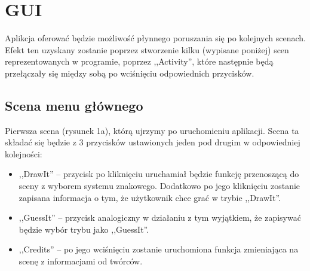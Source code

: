 \documentclass[15pt]{article}
\begin{document}
  \section{GUI}
  Aplikcja oferować będzie możliwość płynnego poruszania się po kolejnych scenach. Efekt ten uzyskany zostanie poprzez stworzenie kilku (wypisane poniżej) scen reprezentowanych w programie, poprzez ,,Activity'', które następnie będą przełączały się między sobą po wciśnięciu odpowiednich przycisków. 
  
  \subsection{Scena menu głównego}
  Pierwsza scena (rysunek 1a), którą ujrzymy po uruchomieniu aplikacji. Scena ta składać się będzie z 3 przycisków ustawionych jeden pod drugim w odpowiedniej kolejności:
  \begin{itemize}
    \item ,,DrawIt'' -- przycisk po kliknięciu uruchamiał będzie funkcję przenoszącą do sceny z wyborem systemu znakowego. Dodatkowo po jego kliknięciu zostanie zapisana informacja o tym, że użytkownik chce grać w trybie ,,DrawIt''.
    \item ,,GuessIt'' -- przycisk analogiczny w działaniu z tym wyjątkiem, że zapisywać będzie wybór trybu jako ,,GuessIt''.
    \item ,,Credits'' -- po jego wciśnięciu zostanie uruchomiona funkcja zmieniająca na scenę z informacjami od twórców.
  \end{itemize}
  
\end{document}
